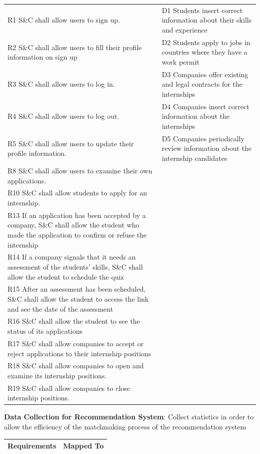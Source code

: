 \begin{enumerate}[label={[G\arabic*]}]
\begin{longtable}{|p{8cm}|p{8cm}|}
R1 S\&C shall allow users to sign up. & D1 Students insert correct information about their skills and experience \\
R2 S\&C shall allow users to fill their profile information on sign up & D2 Students apply to jobs in countries where they have a work permit \\
R3 S\&C shall allow users to log in. & D3 Companies offer existing and legal contracts for the internships \\
R4 S\&C shall allow users to log out. & D4 Companies insert correct information about the internships \\
R5 S\&C shall allow users to update their profile information. & D5 Companies periodically review information about the internship candidates \\
R8 S\&C shall allow users to examine their own applications. & \\
R10 S\&C shall allow students to apply for an internship.     & \\
R13 If an application has been accepted by a company, S\&C shall allow the student who made the application to confirm or refuse the internship & \\
R14 If a company signals that it needs an assessment of the students' skills, S\&C shall allow the student to schedule the quiz & \\
R15 After an assessment has been scheduled, S\&C shall allow the student to access the link and see the date of the assessment & \\
R16 S\&C shall allow the student to see the status of its applications & \\
R17 S\&C shall allow companies to accept or reject applications to their internship positions & \\
R18 S\&C shall allow companies to open and examine its internship positions. & \\
R19 S\&C shall allow companies to close internship positions. & \\
\end{longtable}
\newpage
\item \textbf{Data Collection for Recommendation System}: 
                Collect statistics in order to allow the efficiency of the matchmaking process of the recommendation system 


\begin{longtable}{|p{8cm}|p{8cm}|}
\hline
\rowcolor[HTML]{CFE2F3} 
\textbf{Requirements} & \textbf{Mapped To} \\
\hline
\endfirsthead


\end{longtable}
\end{enumerate}
